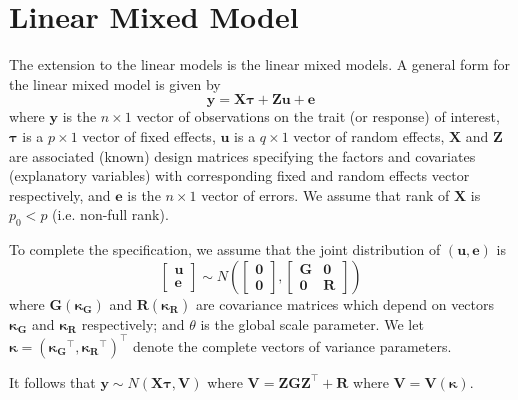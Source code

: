 \chapter{Linear Mixed Model}\label{lmm}
The extension to the linear models is the linear mixed models. A general form for the linear mixed model is given by 
\begin{equation}
\boldsymbol{y} = \boldsymbol{X}\boldsymbol{\tau} + \boldsymbol{Z}\boldsymbol{u} + \boldsymbol{e} \label{eq:lmm}
\end{equation}
where $\boldsymbol{y}$ is the $n\times 1$ vector of observations on the trait (or response) of interest, $\boldsymbol{\tau}$ is a $p \times 1$ vector of fixed effects, $\boldsymbol{u}$ is a $q \times 1$ vector of random effects, $\boldsymbol{X}$ and $\boldsymbol{Z}$ are associated (known) design matrices specifying the factors and covariates (explanatory variables) with corresponding fixed and random effects vector respectively, and $\boldsymbol{e}$ is the $n\times 1$ vector of errors. We assume that rank of $\boldsymbol{X}$ is $p_0 < p$ (i.e. non-full rank). 

To complete the
specification, we assume that the joint distribution of $(\boldsymbol{u}, \boldsymbol{e})$ is
$$ \begin{bmatrix}
\boldsymbol{u} \\
\boldsymbol{e} 
\end{bmatrix}
\sim N \left( 
\begin{bmatrix}
\boldsymbol{0} \\
\boldsymbol{0} 
\end{bmatrix}, 
\begin{bmatrix}
\boldsymbol{G} & \boldsymbol{0} \\
\boldsymbol{0} & \boldsymbol{R} 
\end{bmatrix}
\right)
$$
where $\boldsymbol{G}(\boldsymbol{\kappa_G})$ and $\boldsymbol{R}(\boldsymbol{\kappa_R})$ are covariance matrices which depend on vectors $\boldsymbol{\kappa_G}$ and $\boldsymbol{\kappa_R}$ respectively; and $\theta$ is the global scale parameter. 
We let $\boldsymbol{\kappa} = (\boldsymbol{\kappa_G}^\top, \boldsymbol{\kappa_R}^\top)^\top$ denote the complete vectors of variance parameters. 

It follows that $\boldsymbol{y} \sim N(\boldsymbol{X\tau}, \boldsymbol{V})$ where $\boldsymbol{V} = \boldsymbol{ZGZ}^\top + \boldsymbol{R}$ where $\boldsymbol{V}=\boldsymbol{V}(\boldsymbol{\kappa})$. 
